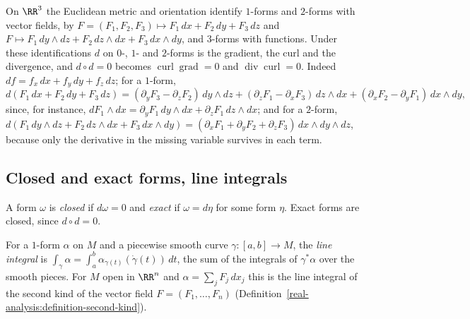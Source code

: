 \begin{example}\label{differential-forms:example-forms-r3}
On $\RR^3$ the Euclidean metric and orientation identify $1$-forms and $2$-forms with vector fields, by $F = (F_1, F_2, F_3) \mapsto F_1\,dx + F_2\,dy + F_3\,dz$ and
$F \mapsto F_1\,dy \wedge dz + F_2\,dz \wedge dx + F_3\,dx \wedge dy$, and $3$-forms with functions. Under these identifications $d$ on $0$-, $1$- and $2$-forms is the gradient, the curl and the divergence, and $d \circ d = 0$ becomes
$\operatorname{curl}\operatorname{grad} = 0$ and $\operatorname{div}\operatorname{curl} = 0$. Indeed $df = f_x\,dx + f_y\,dy + f_z\,dz$; for a $1$-form,
\[
d(F_1\,dx + F_2\,dy + F_3\,dz) = (\partial_yF_3 - \partial_zF_2)\,dy \wedge dz + (\partial_zF_1 - \partial_xF_3)\,dz \wedge dx + (\partial_xF_2 - \partial_yF_1)\,dx \wedge dy,
\]
since, for instance, $dF_1 \wedge dx = \partial_yF_1\,dy \wedge dx + \partial_zF_1\,dz \wedge dx$; and for a $2$-form,
$d(F_1\,dy \wedge dz + F_2\,dz \wedge dx + F_3\,dx \wedge dy) = (\partial_xF_1 + \partial_yF_2 + \partial_zF_3)\,dx \wedge dy \wedge dz$, because only the derivative in the missing variable
survives in each term.
\end{example}

\subsection{Closed and exact forms, line integrals}\label{differential-forms:subsection-closed-exact}

\begin{definition}\label{differential-forms:definition-closed-exact}
A form $\omega$ is \emph{closed} if $d\omega = 0$ and \emph{exact} if $\omega = d\eta$ for some form $\eta$. Exact forms are closed, since $d \circ d = 0$.
\end{definition}

\begin{definition}\label{differential-forms:definition-line-integral}
For a $1$-form $\alpha$ on $M$ and a piecewise smooth curve $\gamma \colon [a, b] \to M$, the \emph{line integral} is $\int_\gamma\alpha = \int_a^b\alpha_{\gamma(t)}(\dot\gamma(t))\,dt$, the sum of the integrals of $\gamma^*\alpha$ over the smooth pieces. For $M$ open in $\RR^n$ and $\alpha = \sum_jF_j\,dx_j$ this is the line integral of the second kind of the vector field
$F = (F_1, \ldots, F_n)$ (Definition~\ref{real-analysis:definition-second-kind}).
\end{definition}

